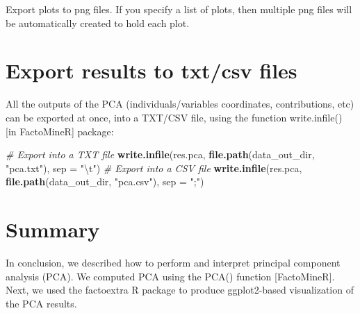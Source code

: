 \documentclass[]{book}
\newenvironment{Shaded}{\begin{snugshade}}{\end{snugshade}}
\newcommand{\CharTok}[1]{\textcolor[rgb]{0.31,0.60,0.02}{#1}}
\newcommand{\CommentTok}[1]{\textcolor[rgb]{0.56,0.35,0.01}{\textit{#1}}}
\newcommand{\DataTypeTok}[1]{\textcolor[rgb]{0.13,0.29,0.53}{#1}}
\newcommand{\KeywordTok}[1]{\textcolor[rgb]{0.13,0.29,0.53}{\textbf{#1}}}
\newcommand{\NormalTok}[1]{#1}
\newcommand{\StringTok}[1]{\textcolor[rgb]{0.31,0.60,0.02}{#1}}
\begin{document}
Export plots to png files. If you specify a list of plots, then multiple png files will be automatically created to hold each plot.

\begin{Shaded}
\end{Shaded}

\hypertarget{export-results-to-txtcsv-files}{%
\section{Export results to txt/csv files}\label{export-results-to-txtcsv-files}}

All the outputs of the PCA (individuals/variables coordinates, contributions, etc) can be exported at once, into a TXT/CSV file, using the function write.infile() {[}in FactoMineR{]} package:

\begin{Shaded}
\begin{Highlighting}[]
\CommentTok{# Export into a TXT file}
\KeywordTok{write.infile}\NormalTok{(res.pca, }\KeywordTok{file.path}\NormalTok{(data_out_dir, }\StringTok{"pca.txt"}\NormalTok{), }\DataTypeTok{sep =} \StringTok{"}\CharTok{\textbackslash{}t}\StringTok{"}\NormalTok{)}
\CommentTok{# Export into a CSV file}
\KeywordTok{write.infile}\NormalTok{(res.pca, }\KeywordTok{file.path}\NormalTok{(data_out_dir, }\StringTok{"pca.csv"}\NormalTok{), }\DataTypeTok{sep =} \StringTok{";"}\NormalTok{)}
\end{Highlighting}
\end{Shaded}

\hypertarget{summary}{%
\section{Summary}\label{summary}}

In conclusion, we described how to perform and interpret principal component analysis (PCA). We computed PCA using the PCA() function {[}FactoMineR{]}. Next, we used the factoextra R package to produce ggplot2-based visualization of the PCA results.
\end{document}
